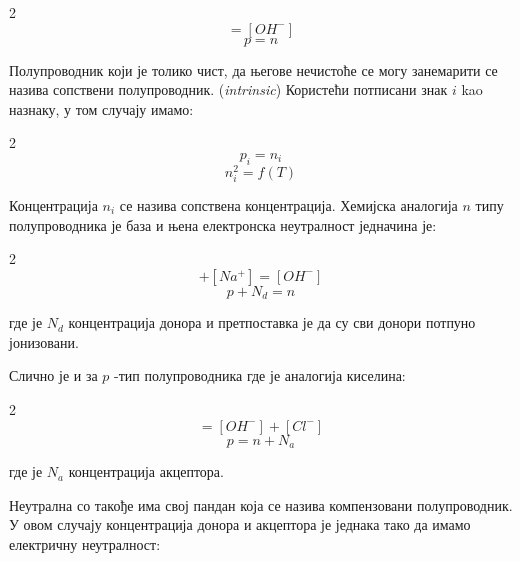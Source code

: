 \documentclass{article}
\begin{document}
\begin{multicols}{2}
    \begin{equation}
        [H^+] = [OH^-]
    \end{equation}\break
    \begin{equation}
        p = n
    \end{equation}
\end{multicols}
  
Полупроводник који је толико чист, да његове нечистоће се могу занемарити се назива сопствени полупроводник. (\textit{intrinsic}) Користећи потписани знак $i$ kao назнаку, у том случају имамо:

\begin{multicols}{2}
    \begin{equation}
        p_i = n_i
    \end{equation}\break
    \begin{equation}
        n_i^2= f(T)
    \end{equation}
\end{multicols}

Концентрација $n_i$ се назива сопствена концентрација.
Хемијска аналогија $n$ типу полупроводника је база и њена електронска неутралност једначина је:

\begin{multicols}{2}
    \begin{equation}
        [H^+] + [Na^+] = [OH^-]
    \end{equation}\break
    \begin{equation}
        p + N_d = n
    \end{equation}
\end{multicols}

где је $N_d$ концентрација донора и претпоставка је да су сви донори потпуно јонизовани.

Слично је и за $p$ -тип полупроводника где је аналогија киселина:

\begin{multicols}{2}
    \begin{equation}
        [H^+] = [OH^-] + [Cl^-]
    \end{equation}\break
    \begin{equation}
        p = n + N_a
    \end{equation}
\end{multicols}

где је $N_a$ концентрација акцептора.

Неутрална со такође има свој пандан која се назива компензовани полупроводник. У овом случају концентрација донора и акцептора је једнака тако да имамо електричну неутралност:
\end{document}
